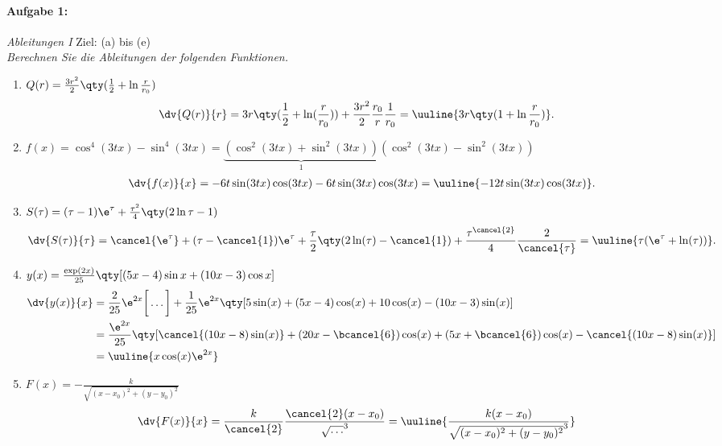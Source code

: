 \paragraph{Aufgabe 1: } \emph{Ableitungen I} \hfill Ziel: (a) bis (e)\\[0.2cm]
\emph{Berechnen Sie die Ableitungen der folgenden Funktionen.}
\begin{enumerate}[label=(\alph*)]
    \setlength{\mathindent}{0cm}
    \item $Q(r)=\frac{3r^2}{2}\qty(\frac{1}{2}+\ln\frac{r}{r_0})$
    \begin{align}
        \dv{Q(r)}{r} &= 3r\qty(\frac{1}{2}+\ln(\frac{r}{r_0})) + \frac{3r^2}{2}\frac{r_0}{r}\frac{1}{r_0} = \uuline{3r\qty(1+\ln \frac{r}{r_0})}.
    \end{align}
    \item $f(x)=\cos^4(3tx)-\sin^4(3tx) = \underbrace{(\cos^2(3tx)+\sin^2(3tx))}_{1}(\cos^2(3tx)-\sin^2(3tx))$ 
    \begin{align}
        \dv{f(x)}{x} = -6t \sin(3tx)\cos(3tx) - 6t\sin(3tx)\cos(3tx) = \uuline{-12t \sin(3tx)\cos(3tx)}.
    \end{align}
    \item $S(\tau)=(\tau-1)\e^{\tau}+\frac{\tau^2}{4}\qty(2\ln\tau-1)$
    \begin{align}
        \dv{S(\tau)}{\tau} = \cancel{\e^{\tau}} + (\tau-\cancel{1})\e^\tau + \frac{\tau}{2}\qty(2\ln(\tau)-\cancel{1}) + \frac{\tau^{\cancel{2}}}{4} \frac{2}{\cancel{\tau}} = \uuline{\tau(\e^{\tau} + \ln(\tau))}.
    \end{align}
    \item $y(x)=\frac{\exp(2x)}{25}\qty[(5x-4)\sin x+(10x-3)\cos x]$
    \begin{align}
        \dv{y(x)}{x} &= \frac{2}{25} \e^{2x} \bigg[\hdots \bigg] + \frac{1}{25}\e^{2x} \qty[5 \sin(x) + (5x-4)\cos(x) + 10\cos(x)-(10x-3)\sin(x)] \\
        &= \frac{\e^{2x}}{25}\qty[\cancel{(10x-8)\sin(x)}+(20x-\bcancel{6})\cos(x) + (5x+\bcancel{6})\cos(x) - \cancel{(10x-8)\sin(x)}] \notag \\
        &= \uuline{x \cos(x) \e^{2x}}
    \end{align}
    \item $F(x)=-\frac{k}{\sqrt{(x-x_0)^2+(y-y_0)^2}}$
    \begin{align}
        \dv{F(x)}{x} &= \frac{k}{\cancel{2}} \frac{\cancel{2}(x-x_0)}{\sqrt{\hdots}^3} = \uuline{\frac{k(x-x_0)}{\sqrt{(x-x_0)^2+(y-y_0)^2}^3}}
    \end{align}

\end{enumerate}
